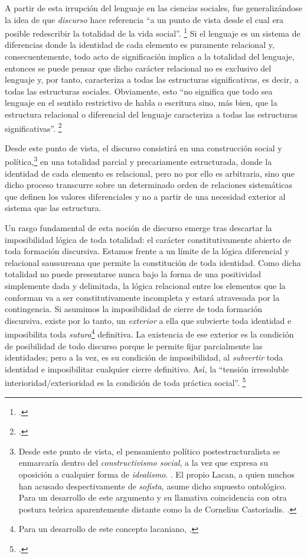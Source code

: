A partir de esta irrupción del lenguaje en las ciencias sociales, fue generalizándose la idea de que \emph{discurso} hace referencia \enquote{a un punto de vista desde el cual era posible redescribir la totalidad de la vida social}. \footcite[][3]{@7000-LACLAU2004} Si el lenguaje es un sistema de diferencias donde la identidad de cada elemento es puramente relacional y, consecuentemente, todo acto de significación implica a la totalidad del lenguaje, entonces se puede pensar que dicho carácter relacional no es exclusivo del lenguaje y, por tanto, caracteriza a todas las estructuras significativas, es decir, a todas las estructuras sociales. Obviamente, esto \enquote{no significa que todo sea lenguaje en el sentido restrictivo de habla o escritura sino, más bien, que la estructura relacional o diferencial del lenguaje caracteriza a todas las estructuras significativas}. \footcite[][124]{@6999-LACLAU1990}

Desde este punto de vista, el discurso consistirá en una construcción social y política,\footnote{Desde este punto de vista, el pensamiento político postestructuralista se enmarcaría dentro del \emph{constructivismo social}, a la vez que expresa su oposición a cualquier forma de \emph{idealismo}.  \cite[Véase][]{@7002-GROPPO2009}. El propio Lacan, a quien muchos han acusado despectivamente de \emph{sofista}, asume dicho supuesto ontológico. Para un desarrollo de este argumento y su llamativa coincidencia con otra postura teórica aparentemente distante como la de Cornelius Castoriadis. \cite[Véase][]{@7003-STAVRAKAKIS2010}.} en una totalidad parcial y precariamente estructurada, donde la identidad de cada elemento es relacional, pero no por ello es arbitraria, sino que dicho proceso transcurre sobre un determinado orden de relaciones sistemáticas que definen los valores diferenciales y no a partir de una necesidad exterior al sistema que las estructura.

Un rasgo fundamental de esta noción de discurso emerge tras descartar la imposibilidad lógica de toda totalidad: el carácter constitutivamente abierto de toda formación discursiva. Estamos frente a un límite de la lógica diferencial y relacional saussureana que permite la constitución de toda identidad. Como dicha totalidad no puede presentarse nunca bajo la forma de una positividad simplemente dada y delimitada, la lógica relacional entre los elementos que la conforman va a ser constitutivamente incompleta y estará atravesada por la contingencia. Si asumimos la imposibilidad de cierre de toda formación discursiva, existe por lo tanto, un \emph{exterior} a ella que subvierte toda identidad e imposibilita toda \emph{sutura}\footnote{Para un desarrollo de este concepto lacaniano, \cite[][]{@7005-MILLER2008}.} definitiva. La existencia de ese exterior  es la condición de posibilidad de todo discurso porque le permite fijar parcialmente las identidades; pero a la vez, es su condición de imposibilidad, al \emph{subvertir} toda identidad e imposibilitar cualquier cierre definitivo. Así, la \enquote{tensión irresoluble interioridad/exterioridad es la condición de toda práctica social}. \footcite[][151]{@7025-LACLAU2006}

